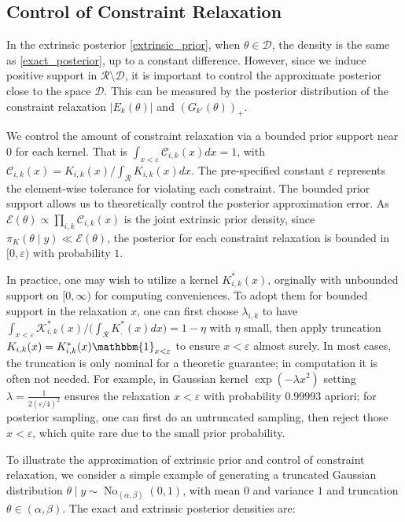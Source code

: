 \documentclass[10pt]{article}
\newcommand{\mc}[1]{\mathcal{#1}}
\DeclareMathOperator{\No}{No}
\begin{document}
\subsection{Control of Constraint Relaxation}

In the extrinsic posterior \eqref{extrinsic_prior}, when $\theta \in \mc D$, the density is the same as \eqref{exact_posterior}, up to a constant difference. However, since we induce positive support in $\mc R \setminus \mc D$, it is important to control the approximate posterior close to the space $\mc D$. This can be measured by the posterior distribution of the constraint relaxation $|E_k(\theta)|$ and $(G_{k'}(\theta))_+$.

We control the amount of constraint relaxation via a bounded prior support near $0$ for each kernel.  That is $\int_{x<\varepsilon} \mc C_{i,k}(x)  dx= 1$, with  $\mc C_{i,k}(x) = K_{i,k}(x) / \int_{\mc R}K_{i,k}(x) dx$. The pre-specified constant $\varepsilon$ represents the element-wise tolerance for violating each constraint. The bounded prior support allows us to theoretically control the posterior approximation error. As $\mc E(\theta) \propto \prod_{i,k} \mc C_{i,k}(x)$ is the joint extrinsic prior density, since $\pi_K(\theta \mid y) \ll \mc E(\theta)$, the posterior for each constraint relaxation is bounded in $[0,\varepsilon)$ with probability $1$.

In practice, one may wish to utilize a kernel $K^*_{i,k}(x)$, orginally with unbounded support on $[0,\infty)$ for computing conveniences. To adopt them for bounded support in the relaxation $x$, one can first choose $\lambda_{i,k}$ to have $\int_{x<\varepsilon} \mc K^*_{i,k}(x)/ \big( \int_{\mc R} K^*_{.}(x) dx\big ) = 1-\eta$ with $\eta$ small, then apply truncation $K_{i,k}(x)= K^*_{i,k}(x) \mathbbm{1}_{x<\varepsilon}$ to ensure $x<\varepsilon$ almost surely. In most cases, the truncation is only nominal for a theoretic guarantee; in computation it is often not needed. For example, in Gaussian kernel $\exp( -{\lambda x^2})$ setting $\lambda = \frac{1}{ 2(\varepsilon/4)^2}$ ensures the relaxation $x<\varepsilon$ with probability $0.99993$ apriori; for posterior sampling, one can first do an untruncated sampling, then reject those $x<\varepsilon$, which quite rare due to the small prior probability. 


To illustrate the approximation of extrinsic prior and control of constraint relaxation, we consider a simple example of generating a truncated Gaussian distribution $\theta \mid y \sim \No_{(\alpha,\beta)}(0,1)$, with mean $0$ and variance $1$ and truncation $\theta\in (\alpha,\beta)$. The exact and extrinsic posterior densities are:
\end{document}
